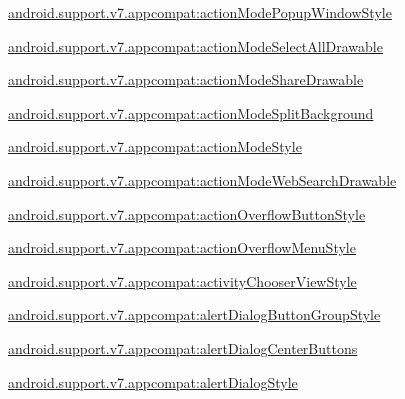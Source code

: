 {\ttfamily \hyperlink{classandroid_1_1support_1_1v7_1_1appcompat_1_1R_1_1styleable_a1d1be910b7e7c20247eb09a8f6cae188}{android.\+support.\+v7.\+appcompat\+:action\+Mode\+Popup\+Window\+Style}}

{\ttfamily \hyperlink{classandroid_1_1support_1_1v7_1_1appcompat_1_1R_1_1styleable_a9daa3ba4c62eccd6f00e0b2c177300cc}{android.\+support.\+v7.\+appcompat\+:action\+Mode\+Select\+All\+Drawable}}

{\ttfamily \hyperlink{classandroid_1_1support_1_1v7_1_1appcompat_1_1R_1_1styleable_a25ba173dd015eb93ea75a3a0882ee84a}{android.\+support.\+v7.\+appcompat\+:action\+Mode\+Share\+Drawable}}

{\ttfamily \hyperlink{classandroid_1_1support_1_1v7_1_1appcompat_1_1R_1_1styleable_a98ad62c525f3ba1cf67f00a6acd9f183}{android.\+support.\+v7.\+appcompat\+:action\+Mode\+Split\+Background}}

{\ttfamily \hyperlink{classandroid_1_1support_1_1v7_1_1appcompat_1_1R_1_1styleable_a8e56a0020ace1566c0563e99c269d0a5}{android.\+support.\+v7.\+appcompat\+:action\+Mode\+Style}}

{\ttfamily \hyperlink{classandroid_1_1support_1_1v7_1_1appcompat_1_1R_1_1styleable_a0fdd41429fa2dd5551582ce389ca7ccb}{android.\+support.\+v7.\+appcompat\+:action\+Mode\+Web\+Search\+Drawable}}

{\ttfamily \hyperlink{classandroid_1_1support_1_1v7_1_1appcompat_1_1R_1_1styleable_a5f0827c31aa835ebff88c10bb4cb11bb}{android.\+support.\+v7.\+appcompat\+:action\+Overflow\+Button\+Style}}

{\ttfamily \hyperlink{classandroid_1_1support_1_1v7_1_1appcompat_1_1R_1_1styleable_a50068fdeae95834f3e3fdd6649df494c}{android.\+support.\+v7.\+appcompat\+:action\+Overflow\+Menu\+Style}}

{\ttfamily \hyperlink{classandroid_1_1support_1_1v7_1_1appcompat_1_1R_1_1styleable_a0023b350c96a4afa01a44c9f0bf8a3a1}{android.\+support.\+v7.\+appcompat\+:activity\+Chooser\+View\+Style}}

{\ttfamily \hyperlink{classandroid_1_1support_1_1v7_1_1appcompat_1_1R_1_1styleable_a2887029a2a12510cb561a99124ec7bdf}{android.\+support.\+v7.\+appcompat\+:alert\+Dialog\+Button\+Group\+Style}}

{\ttfamily \hyperlink{classandroid_1_1support_1_1v7_1_1appcompat_1_1R_1_1styleable_a3cc8519bf3de53533dfa7fdce1db7bc7}{android.\+support.\+v7.\+appcompat\+:alert\+Dialog\+Center\+Buttons}}

{\ttfamily \hyperlink{classandroid_1_1support_1_1v7_1_1appcompat_1_1R_1_1styleable_a543b853df6b700874bf0296f96f96e72}{android.\+support.\+v7.\+appcompat\+:alert\+Dialog\+Style}}

